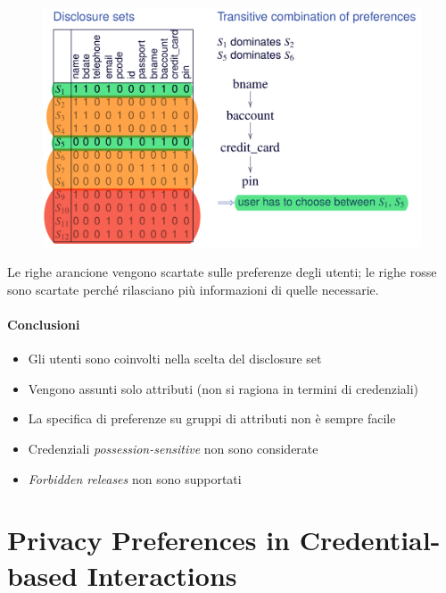 \documentclass{report}
\begin{document}
\begin{figure}[ht]
    \centering
    \includegraphics[width=1\linewidth]{images/logic-ex.png}
\end{figure}

Le righe arancione vengono scartate sulle preferenze degli utenti; le righe rosse 
sono scartate perché rilasciano più informazioni di quelle necessarie.

\newpage
\subsubsection{Conclusioni}
\begin{itemize}
    \item Gli utenti sono coinvolti nella scelta del disclosure set
    \item Vengono assunti solo attributi (non si ragiona in termini di credenziali)
    \item La specifica di preferenze su gruppi di attributi non è sempre facile
    \item Credenziali \textit{possession-sensitive} non sono considerate
    \item \textit{Forbidden releases} non sono supportati
\end{itemize}

\chapter{Privacy Preferences in Credential-based Interactions}
\end{document}
